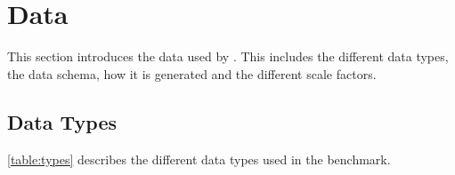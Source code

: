 
\section{Data}
\label{section:data}

This section introduces the data used by \ldbcsnb. This includes the different
data types, the data schema, how it is generated and the different scale
factors.

\subsection{Data Types}
\autoref{table:types} describes the different data types used in the benchmark.

